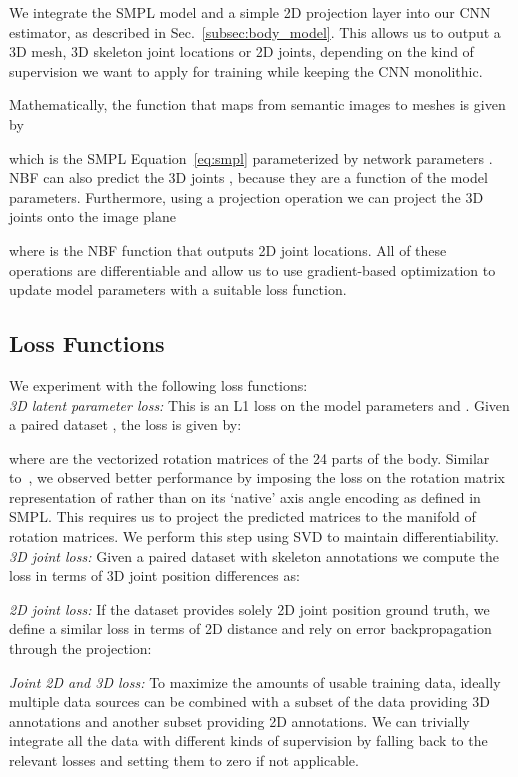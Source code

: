 \documentclass[10pt,twocolumn,letterpaper]{article}
\begin{document}
We integrate the SMPL model and a simple 2D projection layer into our CNN estimator, as described in Sec.~\ref{subsec:body_model}. 
This allows us to output a 3D mesh, 3D skeleton joint locations or 2D joints, depending on the kind of supervision we want to apply for training while keeping the CNN monolithic.

Mathematically, the function  that maps from semantic images to meshes is given by

which is the SMPL Equation~\eqref{eq:smpl} parameterized by network parameters . NBF can also predict the 3D joints , because they are a function of the model parameters. Furthermore, using a projection operation  we can project the 3D joints onto the image plane

where  is the NBF function that outputs 2D joint locations. All of these operations are differentiable and allow us to use gradient-based optimization to update model parameters with a suitable loss function.

\subsection{Loss Functions}\label{sec:loss-functions}

We experiment with the following loss functions:\\
{\em 3D latent parameter loss: } This is an L1 loss on the model parameters  and . Given a paired dataset , the loss is given by:

where  are the vectorized rotation matrices of the 24 parts of the body. Similar to~\cite{Lassner:UP:2017, pavlakos2018humanshape}, we observed better performance by imposing the loss on the rotation matrix representation of  rather than on its `native' axis angle encoding as defined in SMPL. This requires us to project the predicted matrices to the manifold of rotation matrices. We perform this step using SVD to maintain differentiability.
\\
{\em 3D joint loss: }  Given a paired dataset with skeleton annotations  we compute the loss in terms of 3D joint position differences as:

{\em 2D joint loss:} If the dataset  provides solely 2D joint position ground truth, we define a similar loss in terms of 2D distance and rely on error backpropagation through the projection:

{\em Joint 2D and 3D loss: }
To maximize the amounts of usable training data, ideally multiple data sources can be combined with a subset of the data  providing 3D annotations and another subset  providing 2D annotations. We can trivially integrate all the data with different kinds of supervision by falling back to the relevant losses and setting them to zero if not applicable.
\end{document}
